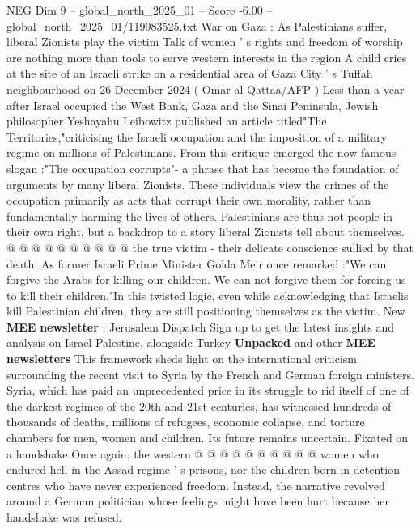 \begin{textsample}{NEG Dim 9 – global\_north\_2025\_01 – Score -6.00 – global\_north\_2025\_01/119983525.txt}  \label{ex:f9_neg_104}
War on Gaza : As Palestinians suffer, liberal Zionists play the victim Talk of women ' s rights and freedom of worship are nothing more than tools to serve western interests in the region A child cries at the site of an Israeli strike on a residential area of Gaza City ' s Tuffah neighbourhood on 26 December 2024 ( Omar al-Qattaa/AFP ) Less than a year after Israel occupied the West Bank, Gaza and the Sinai Peninsula, Jewish philosopher Yeshayahu Leibowitz published an article titled"The Territories,"criticising the Israeli occupation and the imposition of a military regime on millions of Palestinians.
From this critique emerged the now-famous slogan :"The occupation corrupts"- a phrase that has become the foundation of arguments by many liberal Zionists.
These individuals view the crimes of the occupation primarily as acts that corrupt their own morality, rather than fundamentally harming the lives of others.
Palestinians are thus not people in their own right, but a backdrop to a story liberal Zionists tell about themselves. @ @ @ @ @ @ @ @ @ @ the true victim - their delicate conscience sullied by that death.
As former Israeli Prime Minister Golda Meir once remarked :"We can forgive the Arabs for killing our children.
We can not forgive them for forcing us to kill their children."In this twisted logic, even while acknowledging that Israelis kill Palestinian children, they are still positioning themselves as the victim.
New \textbf{MEE} \textbf{newsletter} : Jerusalem Dispatch Sign up to get the latest insights and analysis on Israel-Palestine, alongside Turkey \textbf{Unpacked} and other \textbf{MEE} \textbf{newsletters} This framework sheds light on the international criticism surrounding the recent visit to Syria by the French and German foreign ministers.
Syria, which has paid an unprecedented price in its struggle to rid itself of one of the darkest regimes of the 20th and 21st centuries, has witnessed hundreds of thousands of deaths, millions of refugees, economic collapse, and torture chambers for men, women and children.
Its future remains uncertain.
Fixated on a handshake Once again, the western @ @ @ @ @ @ @ @ @ @ women who endured hell in the Assad regime ' s prisons, nor the children born in detention centres who have never experienced freedom.
Instead, the narrative revolved around a German politician whose feelings might have been hurt because her handshake was refused.

\end{textsample}
